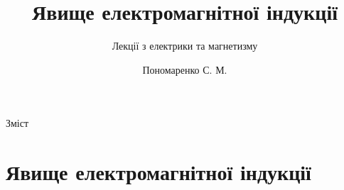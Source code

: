 \documentclass[onlytextwidth]{beamer}
\title[Лекції електрики та магнетизму]{\huge\bfseries Явище електромагнітної індукції}
\subtitle{Лекції з електрики та магнетизму}
\author{Пономаренко С. М.}
\date{}
\begin{document}
\begin{frame}[plain]
	\maketitle
\end{frame}

\begin{frame}{Зміст}{}
	\tableofcontents
\end{frame}



\section{Явище електромагнітної індукції}
\end{document}
